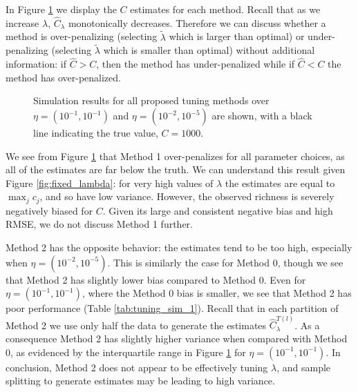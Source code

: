 \documentclass[oupdraft]{bio}
\begin{document}
In Figure \ref{fig:tuning_sim_1} we display the $C$ estimates for each method.  Recall that as we increase $\lambda$, $\widehat{C}_\lambda$ monotonically decreases.  Therefore we can discuss whether a method is over-penalizing (selecting $\widetilde{\lambda}$ which is larger than optimal) or under-penalizing (selecting $\widetilde{\lambda}$ which is smaller than optimal) without additional information: if $\widehat{C} > C$, then the method has under-penalized while if $\widehat{C} < C$ the method has over-penalized.



\begin{figure}[t]
\caption{Simulation results for all proposed tuning methods over $\eta = (10^{-1}, 10^{-1})$ and $\eta = (10^{-2}, 10^{-5})$ are shown, with a black line indicating the true value, $C = 1000$.
\label{fig:tuning_sim_1}}
\centering{}
\end{figure}

We see from Figure \ref{fig:tuning_sim_1} that Method 1 over-penalizes for all parameter choices, as all of the estimates are far below the truth. We can understand this result given Figure \ref{fig:fixed_lambda}: for very high values of $\lambda$ the estimates are equal to $\max_j c_j$, and so have low variance. However, the observed richness is severely negatively biased for $C$. Given its large and consistent negative bias and high RMSE, we do not discuss  Method 1 further.

Method 2 has the opposite behavior: the estimates tend to be too high, especially when $\eta = (10^{-2}, 10^{-5})$. This is similarly the case for Method 0, though we see that Method 2 has slightly lower bias compared to Method 0.  %
Even for $\eta = (10^{-1}, 10^{-1})$, where the Method 0 bias is smaller, we see that Method 2 has poor performance (Table \ref{tab:tuning_sim_1}).  Recall that in each partition of Method 2 we use only half the data to generate the estimates $\widehat{C}^{T(l)}_{\lambda}$.  As a consequence Method 2 has slightly higher variance when compared with Method 0, as evidenced by the interquartile range in Figure \ref{fig:tuning_sim_1} for $\eta = (10^{-1}, 10^{-1})$.  In conclusion, Method 2 does not appear to be effectively
tuning $\lambda$, and sample splitting to generate estimates may be leading to high variance.
\end{document}
